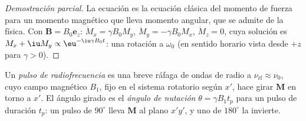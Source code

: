 \begin{proof}[Demostración parcial]
La ecuación es la ecuación clásica del momento de fuerza para un momento magnético que lleva
momento angular, que se admite de la física. Con $\mathbf B = B_0\mathbf e_z$: $\dot M_x = \gamma
B_0M_y$, $\dot M_y = -\gamma B_0M_x$, $\dot M_z = 0$, cuya solución es $M_x + \iu M_y \propto
\eu^{-\iu\gamma B_0t}$: una rotación a $\omega_0$ (en sentido horario vista desde $+z$ para $\gamma > 0$).
\end{proof}

\begin{definition}\label{def:b3:advanced-nmr:pulse}
Un \emph{pulso de radiofrecuencia} es una breve ráfaga de
ondas de radio a $\nu_{\mathrm{rf}} \approx \nu_0$, cuyo campo magnético $B_1$, fijo en el
sistema rotatorio según $x'$, hace girar $\mathbf M$ en torno a $x'$. El ángulo girado es el
\emph{ángulo de nutación} $\theta = \gamma B_1t_p$ para un pulso de duración
$t_p$: un pulso de $90^\circ$ lleva $\mathbf M$ al plano $x'y'$, y uno de $180^\circ$ la
invierte.
\end{definition}

